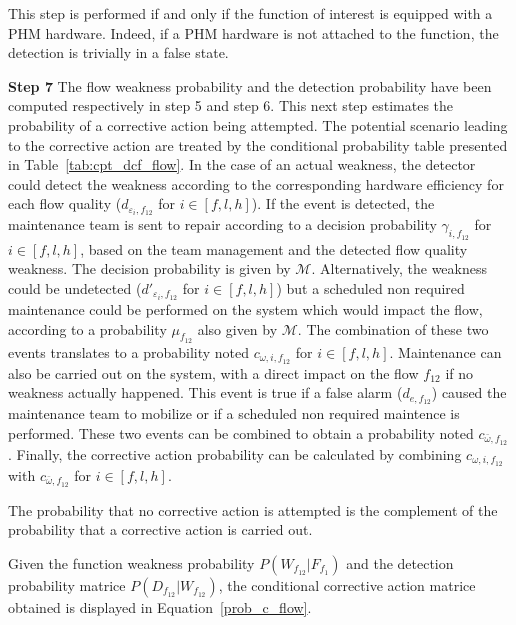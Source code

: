 This step is performed if and only if the function of interest is equipped with a PHM hardware. Indeed, if a PHM hardware is not attached to the function, the detection is trivially in a false state.


\textbf{Step 7}\hspace{5pt}
The flow weakness probability and the detection probability have been computed respectively in step 5 and step 6. This next step estimates the probability of a corrective action being attempted. The potential scenario leading to the corrective action are treated by the conditional probability table presented in Table~\ref{tab:cpt_dcf_flow}. In the case of an actual weakness, the detector could detect the weakness according to the corresponding hardware efficiency for each flow quality ($d_{\varepsilon_i, f_{12}}$ for $i \in [f, l, h]$). If the event is detected, the maintenance team is sent to repair according to a decision probability $\gamma_{i, f_{12}}$ for $i \in [f, l, h]$, based on the team management and the detected flow quality weakness. The decision probability is given by $\mathscr{M}$. Alternatively, the weakness could be undetected ($d'_{\varepsilon_i, f_{12}}$ for $i \in [f, l, h]$) but a scheduled non required maintenance could be performed on the system which would impact the flow, according to a probability $\mu_{f_{12}}$ also given by $\mathscr{M}$. The combination of these two events translates to a probability noted $c_{\omega, i, f_{12}}$ for $i \in [f, l, h]$. Maintenance can also be carried out on the system, with a direct impact on the flow $f_{12}$ if no weakness actually happened. This event is true if a false alarm ($d_{e, f_{12}}$) caused the maintenance team to mobilize or if a scheduled non required maintence is performed. These two events can be combined to obtain a probability noted $c_{\bar{\omega}, f_{12}}$. Finally, the corrective action probability can be calculated by combining $c_{\omega, i, f_{12}}$ with $c_{\bar{\omega}, f_{12}}$ for $i \in [f, l, h]$.

The probability that no corrective action is attempted is the complement of the probability that a corrective action is carried out.


Given the function weakness probability $P(W_{f_{12}} | F_{f_1})$ and the detection probability matrice $P(D_{f_{12}} | W_{f_{12}})$, the conditional corrective action matrice obtained is displayed in Equation~\ref{prob_c_flow}.

